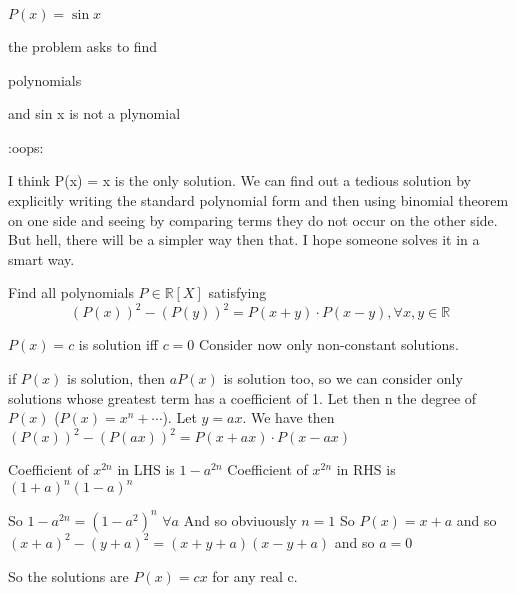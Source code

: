\begin{solution}
	\begin{tcolorbox}$ P(x) = \sin x$\end{tcolorbox}
 the problem asks to find \begin{bolded}polynomials\end{bolded}  and sin x is not a plynomial
\end{solution}



\begin{solution}
	:oops:
\end{solution}



\begin{solution}
	I think P(x) = x is the only solution. We can find out a tedious solution by explicitly writing the standard polynomial form and then using binomial theorem on one side and seeing by comparing terms they do not occur on the other side. But hell, there will be a simpler way then that. I hope someone solves it in a smart way.
\end{solution}



\begin{solution}
	\begin{tcolorbox}Find all polynomials $ P \in \mathbb{R}[X]$ satisfying
\[ (P(x))^2 - (P(y))^2 = P(x + y)\cdot P(x - y) , \forall x,y \in \mathbb R
\]
\end{tcolorbox}

$ P(x)=c$ is solution iff $ c=0$
Consider now only non-constant solutions.

if $ P(x)$ is solution, then $ aP(x)$ is solution too, so we can consider only solutions whose greatest term has a coefficient of 1.
Let then n the degree of $ P(x)$ ($ P(x)=x^n+\cdots$).
Let $ y=ax$. We have then $ (P(x))^2 - (P(ax))^2 = P(x + ax)\cdot P(x - ax)$

Coefficient of $ x^{2n}$ in LHS is $ 1-a^{2n}$
Coefficient of $ x^{2n}$ in RHS is $ (1+a)^n(1-a)^n$

So $ 1-a^{2n}=(1-a^2)^n$ $ \forall a$ And so obviuously $ n=1$
So $ P(x)=x+a$ and so $ (x+a)^2-(y+a)^2=(x+y+a)(x-y+a)$ and so $ a=0$

So the solutions are $ P(x)=cx$ for any real c.
\end{solution}



